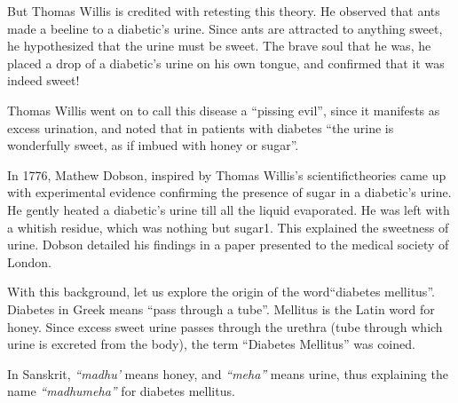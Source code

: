 But Thomas Willis is credited with retesting this theory. He observed that ants made a beeline to a diabetic’s urine. Since ants are attracted to anything sweet, he hypothesized that the urine must be sweet. The brave soul that he was, he placed a drop of a diabetic’s urine on his own tongue, and confirmed that it was indeed sweet!

Thomas Willis went on to call this disease a “pissing evil”, since it manifests as excess urination, and noted that in patients with diabetes “the urine is wonderfully sweet, as if imbued with honey or sugar”.

In 1776, Mathew Dobson, inspired by Thomas Willis’s scientific\break theories came up with experimental evidence confirming the presence of sugar in a diabetic’s urine. He gently heated a diabetic’s urine till all the liquid evaporated. He was left with a whitish residue, which was nothing but sugar1. This explained the sweetness of urine. Dobson detailed his findings in a paper presented to the medical society of London.

\clearpage

With this background, let us explore the origin of the word\break “diabetes mellitus”. Diabetes in Greek means “pass through a tube”. Mellitus is the Latin word for honey. Since excess sweet urine passes through the urethra (tube through which urine is excreted from the body), the term “Diabetes Mellitus” was coined.

In Sanskrit, \textit{“madhu’} means honey, and \textit{“meha”} means urine, thus explaining the name \textit{“madhumeha”} for diabetes mellitus.


